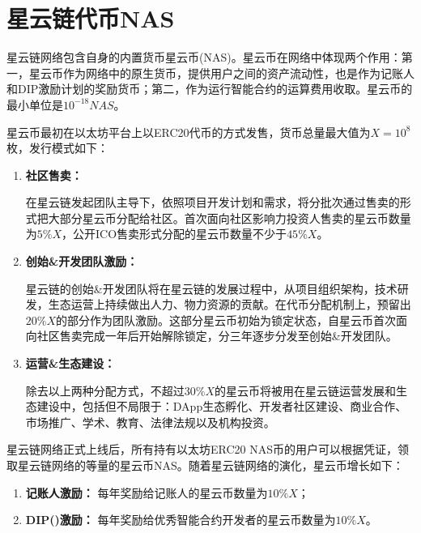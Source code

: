 \section{星云链代币NAS}
星云链网络包含自身的内置货币星云币(NAS)。星云币在网络中体现两个作用：第一，星云币作为网络中的原生货币，提供用户之间的资产流动性，也是作为记账人和DIP激励计划的奖励货币；第二，作为运行智能合约的运算费用收取。星云币的最小单位是$10^{-18}NAS$。

星云币最初在以太坊平台上以ERC20代币的方式发售，货币总量最大值为$X=10^8$枚，发行模式如下：
\begin{enumerate}
	\item \textbf{社区售卖：}
	
在星云链发起团队主导下，依照项目开发计划和需求，将分批次通过售卖的形式把大部分星云币分配给社区。首次面向社区影响力投资人售卖的星云币数量为$5\%X$，公开ICO售卖形式分配的星云币数量不少于$45\%X$。

	\item \textbf{创始\&开发团队激励：}

星云链的创始\&开发团队将在星云链的发展过程中，从项目组织架构，技术研发，生态运营上持续做出人力、物力资源的贡献。在代币分配机制上，预留出$20\%X$的部分作为团队激励。这部分星云币初始为锁定状态，自星云币首次面向社区售卖完成一年后开始解除锁定，分三年逐步分发至创始\&开发团队。

	\item \textbf{运营\&生态建设：}

除去以上两种分配方式，不超过$30\%X$的星云币将被用在星云链运营发展和生态建设中，包括但不局限于：DApp生态孵化、开发者社区建设、商业合作、市场推广、学术、教育、法律法规以及机构投资。
\end{enumerate}

星云链网络正式上线后，所有持有以太坊ERC20 NAS币的用户可以根据凭证，领取星云链网络的等量的星云币NAS。随着星云链网络的演化，星云币增长如下：
\begin{enumerate}
	\item \textbf{记账人激励：}
	每年奖励给记账人的星云币数量为$10\%X$；
	
	\item \textbf{DIP()激励：}
	每年奖励给优秀智能合约开发者的星云币数量为$10\%X$。
\end{enumerate}
